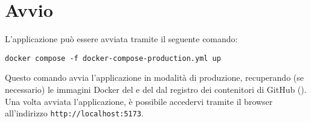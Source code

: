 \section{Avvio}

\par L'applicazione può essere avviata tramite il seguente comando:

\quad \texttt{docker compose -f docker-compose-production.yml up} \newline

\vspace{0.5\baselineskip}
\par Questo comando avvia l'applicazione in modalità di produzione, recuperando (se necessario) le immagini Docker del  e del  dal registro dei contenitori di GitHub (). Una volta avviata l'applicazione, è possibile accedervi tramite il browser all'indirizzo \texttt{http://localhost:5173}.